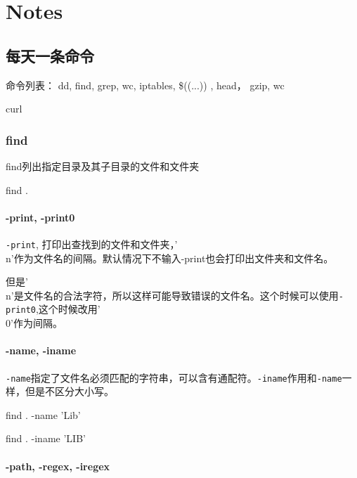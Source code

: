 \chapter{Notes}

\section{每天一条命令}
命令列表：
dd, find, grep, wc, iptables, \$((...)) , head， gzip, wc

curl



\subsection{find}

find列出指定目录及其子目录的文件和文件夹

\begin{Bash}[查找当前目录及子目录的文件和文件夹]
find .
\end{Bash}


\subsubsection{-print, -print0}
\lstinline$-print$, 打印出查找到的文件和文件夹，'\\n'作为文件名的间隔。默认情况下不输入-print也会打印出文件夹和文件名。

但是'\\n'是文件名的合法字符，所以这样可能导致错误的文件名。这个时候可以使用\lstinline$-print0$,这个时候改用'\\0'作为间隔。

\subsubsection{-name, -iname}

\lstinline$-name$指定了文件名必须匹配的字符串，可以含有通配符。\lstinline$-iname$作用和\lstinline$-name$一样，但是不区分大小写。

\begin{Bash}[名字匹配指定的字符串]

find . -name 'Lib'

find . -iname 'LIB'

\end{Bash}


\subsubsection{ -path, -regex, -iregex}


